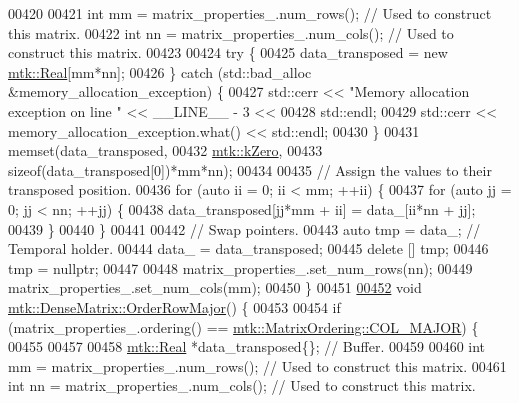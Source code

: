 \begin{DoxyCode}
00420 
00421   \textcolor{keywordtype}{int} mm = matrix\_properties\_.num\_rows(); \textcolor{comment}{// Used to construct this matrix.}
00422   \textcolor{keywordtype}{int} nn = matrix\_properties\_.num\_cols(); \textcolor{comment}{// Used to construct this matrix.}
00423 
00424   \textcolor{keywordflow}{try} \{
00425     data\_transposed = \textcolor{keyword}{new} \hyperlink{group__c01-roots_gac080bbbf5cbb5502c9f00405f894857d}{mtk::Real}[mm*nn];
00426   \} \textcolor{keywordflow}{catch} (std::bad\_alloc &memory\_allocation\_exception) \{
00427     std::cerr << \textcolor{stringliteral}{"Memory allocation exception on line "} << \_\_LINE\_\_ - 3 <<
00428       std::endl;
00429     std::cerr << memory\_allocation\_exception.what() << std::endl;
00430   \}
00431   memset(data\_transposed,
00432          \hyperlink{group__c01-roots_ga59a451a5fae30d59649bcda274fea271}{mtk::kZero},
00433          \textcolor{keyword}{sizeof}(data\_transposed[0])*mm*nn);
00434 
00435   \textcolor{comment}{// Assign the values to their transposed position.}
00436   \textcolor{keywordflow}{for} (\textcolor{keyword}{auto} ii = 0; ii < mm; ++ii) \{
00437     \textcolor{keywordflow}{for} (\textcolor{keyword}{auto} jj = 0; jj < nn; ++jj) \{
00438       data\_transposed[jj*mm + ii] = data\_[ii*nn + jj];
00439     \}
00440   \}
00441 
00442   \textcolor{comment}{// Swap pointers.}
00443   \textcolor{keyword}{auto} tmp = data\_; \textcolor{comment}{// Temporal holder.}
00444   data\_ = data\_transposed;
00445   \textcolor{keyword}{delete} [] tmp;
00446   tmp = \textcolor{keyword}{nullptr};
00447 
00448   matrix\_properties\_.set\_num\_rows(nn);
00449   matrix\_properties\_.set\_num\_cols(mm);
00450 \}
00451 
\hypertarget{mtk__dense__matrix_8cc_source_l00452}{}\hyperlink{classmtk_1_1DenseMatrix_ac2949efba3e8278335d45418c85433e4}{00452} \textcolor{keywordtype}{void} \hyperlink{classmtk_1_1DenseMatrix_ac2949efba3e8278335d45418c85433e4}{mtk::DenseMatrix::OrderRowMajor}() \{
00453 
00454   \textcolor{keywordflow}{if} (matrix\_properties\_.ordering() == \hyperlink{namespacemtk_ga622801bd9f912d0f976c3e383f5f581ca34d2765ffc490951febdcca04bc4f7cd}{mtk::MatrixOrdering::COL\_MAJOR}) \{
00455 
00457 
00458     \hyperlink{group__c01-roots_gac080bbbf5cbb5502c9f00405f894857d}{mtk::Real} *data\_transposed\{\}; \textcolor{comment}{// Buffer.}
00459 
00460     \textcolor{keywordtype}{int} mm = matrix\_properties\_.num\_rows(); \textcolor{comment}{// Used to construct this matrix.}
00461     \textcolor{keywordtype}{int} nn = matrix\_properties\_.num\_cols(); \textcolor{comment}{// Used to construct this matrix.}

\end{DoxyCode}

